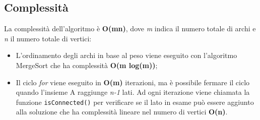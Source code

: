 \subsection{Complessità}
La complessità dell'algoritmo è \textbf{O(mn)}, dove \emph{m} indica il numero totale di archi e \emph{n} il numero totale di vertici:
\begin{itemize}
	\item L'ordinamento degli archi in base al peso viene eseguito con l'algoritmo MergeSort che ha complessità \textbf{O(m log(m))};
	\item Il ciclo \emph{for} viene eseguito in  \textbf{O(m)} iterazioni, ma è possibile fermare il ciclo quando l'insieme A raggiunge \emph{n-1} lati. Ad ogni iterazione viene chiamata la funzione \texttt{isConnected()} per verificare se il lato in esame può essere aggiunto alla soluzione che ha complessità lineare nel numero di vertici \textbf{O(n)}.
\end{itemize}

\pagebreak